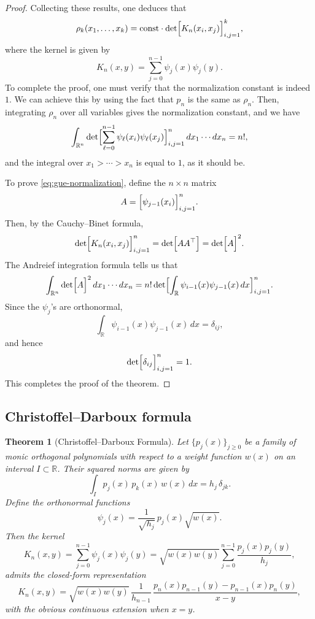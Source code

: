 \documentclass[letterpaper,11pt,oneside,reqno]{article}
\numberwithin{equation}{section}
\newtheorem{theorem}[proposition]{Theorem}
\theoremstyle{definition}
\begin{document}
\begin{proof}
Collecting these results, one deduces that
\[
\rho_k(x_1,\dots,x_k)=
\mathrm{const}\cdot
\det\Bigl[K_n(x_i,x_j)\Bigr]_{i,j=1}^k,
\]
where the kernel is given by
\[
K_n(x,y)=\sum_{j=0}^{n-1}\psi_j(x)\psi_j(y).
\]
To complete the proof, one must verify that the normalization constant is indeed $1$.
We can achieve this by using the fact that $p_n$ is the same as $\rho_n$.
Then, integrating $\rho_n$ over all variables gives the normalization constant,
and we have
\begin{equation}
	\label{eq:gue-normalization}
	\int_{\mathbb{R}^n} \det\Bigl[\sum_{\ell=0}^{n-1}\psi_\ell(x_i)\psi_\ell(x_j)\Bigr]_{i,j=1}^n \,dx_1\cdots dx_n = n!,
\end{equation}
and the integral over $x_1>\cdots>x_n$ is equal to $1$, as it should be.

To prove \eqref{eq:gue-normalization},
define the \(n\times n\) matrix
\[
A=\Bigl[\psi_{j-1}(x_i)\Bigr]_{i,j=1}^n.
\]
Then, by the Cauchy--Binet formula,
\[
\det\Bigl[K_n(x_i,x_j)\Bigr]_{i,j=1}^n = \det\Bigl[AA^\top\Bigr]
=\det\Bigl[A\Bigr]^2.
\]
The Andreief integration formula tells us that
\[
\int_{\mathbb{R}^n} \det\Bigl[A\Bigr]^2\,dx_1\cdots dx_n = n! \det\Bigl[\int_{\mathbb{R}} \psi_{i-1}(x)\psi_{j-1}(x)\,dx\Bigr]_{i,j=1}^n.
\]
Since the \(\psi_j\)'s are orthonormal,
\[
\int_{\mathbb{R}} \psi_{i-1}(x)\psi_{j-1}(x)\,dx = \delta_{ij},
\]
and hence
\[
\det\Bigl[\delta_{ij}\Bigr]_{i,j=1}^n = 1.
\]
This completes the proof of the theorem.
\end{proof}

\subsection{Christoffel--Darboux formula}



\begin{theorem}[Christoffel--Darboux Formula]
Let \(\{p_j(x)\}_{j\ge0}\) be a family of \emph{monic} orthogonal polynomials with respect to a weight function \(w(x)\) on an interval \(I\subset\mathbb{R}\). Their squared norms are given by
\[
\int_I p_j(x)\,p_k(x)\,w(x)\,dx = h_j\,\delta_{jk}.
\]
Define the orthonormal functions
\[
\psi_j(x)=\frac{1}{\sqrt{h_j}}\,p_j(x)\sqrt{w(x)}.
\]
Then the kernel
\[
K_n(x,y)=\sum_{j=0}^{n-1}\psi_j(x)\psi_j(y)
=\sqrt{w(x)w(y)}\sum_{j=0}^{n-1}\frac{p_j(x)p_j(y)}{h_j},
\]
admits the closed-form representation
\begin{equation}
\label{eq:CD}
K_n(x,y)=\sqrt{w(x)w(y)}\,\frac{1}{h_{n-1}}\,\frac{p_n(x)p_{n-1}(y)-p_{n-1}(x)p_n(y)}{x-y},
\end{equation}
with the obvious continuous extension when \(x=y\).
\end{theorem}
\end{document}
